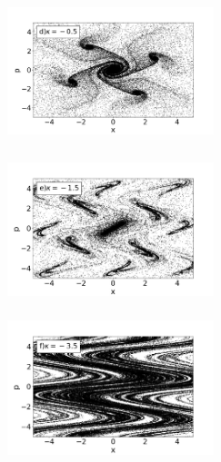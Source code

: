 \documentclass[letterpaper,12pt,oneside]{book}
\begin{document}
\begin{figure}[h!]
\begin{minipage}{0.32\textwidth}
		\includegraphics[width=6cm,height=4.5cm]{FigsJPG/PhaseSpace_dd}
	\end{minipage}
	\begin{minipage}{0.32\textwidth}
		\includegraphics[width=6cm,height=4.5cm]{FigsJPG/PhaseSpace_ee}
	\end{minipage}
	\begin{minipage}{0.32\textwidth}
		\includegraphics[width=6cm,height=4.5cm]{FigsJPG/PhaseSpace_ff}
		
	\end{minipage}\\
	\begin{minipage}{0.32\textwidth}
		

\end{minipage}
\end{figure}
\end{document}

